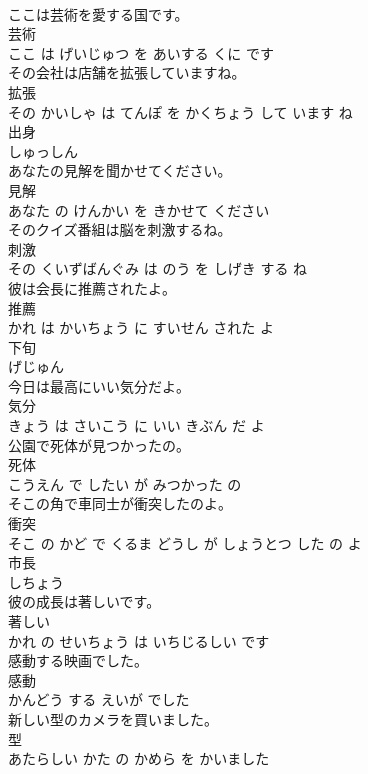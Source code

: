 \documentclass[8pt]{extreport}
\begin{document}
\begin{CJK}{UTF8}{min}
\\	ここは芸術を愛する国です。	
\\	芸術 
\\	ここ は げいじゅつ を あいする くに です		
\\	その会社は店舗を拡張していますね。	
\\	拡張 
\\	その かいしゃ は てんぽ を かくちょう して います ね		
\\	出身	
\\	しゅっしん		
\\	あなたの見解を聞かせてください。	
\\	見解 
\\	あなた の けんかい を きかせて ください		
\\	そのクイズ番組は脳を刺激するね。	
\\	刺激 
\\	その くいずばんぐみ は のう を しげき する ね		
\\	彼は会長に推薦されたよ。	
\\	推薦 
\\	かれ は かいちょう に すいせん された よ		
\\	下旬	
\\	げじゅん		
\\	今日は最高にいい気分だよ。	
\\	気分 
\\	きょう は さいこう に いい きぶん だ よ		
\\	公園で死体が見つかったの。	
\\	死体 
\\	こうえん で したい が みつかった の		
\\	そこの角で車同士が衝突したのよ。	
\\	衝突 
\\	そこ の かど で くるま どうし が しょうとつ した の よ		
\\	市長	
\\	しちょう		
\\	彼の成長は著しいです。	
\\	著しい 
\\	かれ の せいちょう は いちじるしい です		
\\	感動する映画でした。	
\\	感動 
\\	かんどう する えいが でした		
\\	新しい型のカメラを買いました。	
\\	型 
\\	あたらしい かた の かめら を かいました		

\end{CJK}
\end{document}
